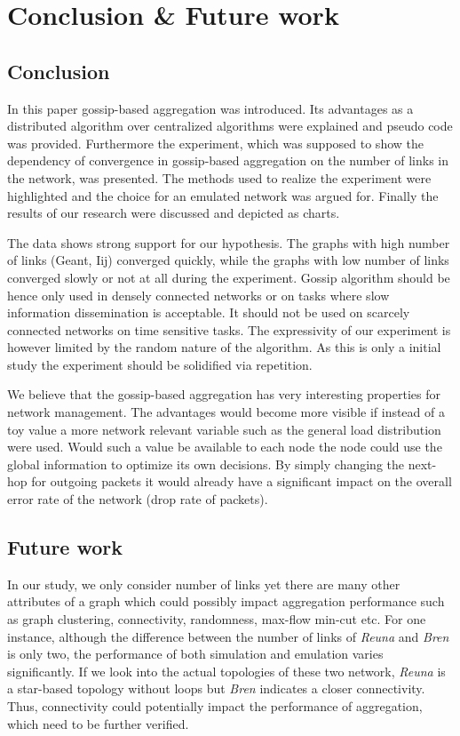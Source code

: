 \section{Conclusion \& Future work}
\label{sec:conclusion}

\subsection{Conclusion}
In this paper gossip-based aggregation was introduced. Its advantages as a distributed algorithm over centralized algorithms were explained and pseudo code was provided. Furthermore the experiment, which was supposed to show the dependency of convergence in gossip-based aggregation on the number of links in the network, was presented. The methods used to realize the experiment were highlighted and the choice for an emulated network was argued for. Finally the results of our research were discussed and depicted as charts.

The data shows strong support for our hypothesis. The graphs with high number of links (Geant, Iij) converged quickly, while the graphs with low number of links converged slowly or not at all during the experiment. Gossip algorithm should be hence only used in densely connected networks or on tasks where slow information dissemination is acceptable. It should not be used on scarcely connected networks on time sensitive tasks. The expressivity of our experiment is however limited by the random nature of the algorithm. As this is only a initial study the experiment should be solidified via repetition.

We believe that the gossip-based aggregation has very interesting properties for network management. The advantages would become more visible if instead of a toy value a more network relevant variable such as the general load distribution were used. Would such a value be available to each node the node could use the global information to optimize its own decisions. By simply changing the next-hop for outgoing packets it would already have a significant impact on the overall error rate of the network (drop rate of packets).

\subsection{Future work}
In our study, we only consider number of links yet there are many other attributes of a graph which could possibly impact aggregation performance such as graph clustering\cite{Schaeffer200727}, connectivity, randomness, max-flow min-cut etc. For one instance, although the difference between the number of links of {\it Reuna} and {\it Bren} is only two, the performance of both simulation and emulation varies significantly. If we look into the actual topologies of these two network, {\it Reuna} is a star-based topology without loops but {\it Bren} indicates a closer connectivity. Thus, connectivity could potentially impact the performance of aggregation, which need to be further verified.

